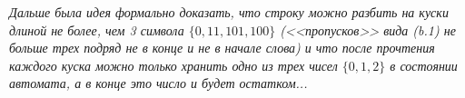 \documentclass[a4paper]{article}
\def\A{{\cal A}}
\begin{document}
\begin{enumerate}[1.]
{\em Дальше была идея формально доказать, что строку можно разбить на куски длиной не более, чем 3 символа $\{0,11,101,100\}$ (<<пропусков>> вида (b.1) не больше трех подряд не в конце и не в начале слова) и что после прочтения каждого куска можно только хранить одно из трех чисел $\{0,1,2\}$ в состоянии автомата, а в конце это число и будет остатком...}
\end{enumerate}
\end{document}
